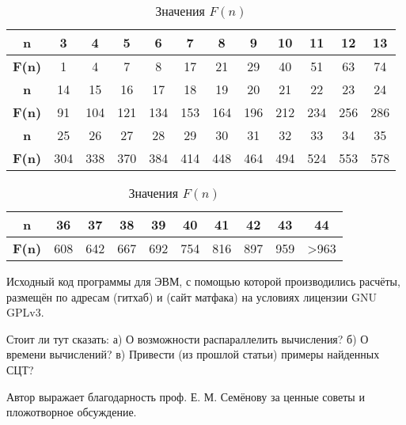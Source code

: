 \documentclass{article}
\begin{document}
\begin{table}[H]
\caption{Значения $F(n)$}
\label{tabular:pc_counted}
\begin{center}
\begin{tabular}{|c|c|c|c|c|c|c|c|c|c|c|c|}
\hline
\textbf{n}    &  3 & 4 & 5 & 6 &  7 &  8 &  9 & 10 & 11 & 12 & 13 \\
\hline
\textbf{F(n)} &  1 & 4 & 7 & 8 & 17 & 21 & 29 & 40 & 51 & 63 & 74  \\
\hline
\hline
\textbf{n}    &  14 &  15 &  16 &  17 &  18 &  19 &  20 &  21 &  22 &  23 &  24 \\
\hline
\textbf{F(n)} &  91 & 104 & 121 & 134 & 153 & 164 & 196 & 212 & 234 & 256 & 286  \\
\hline
\hline
\textbf{n}    &  25 &  26 &  27 &  28 &  29 &  30 &  31 &  32 &  33 &  34 &  35 \\
\hline
\textbf{F(n)} & 304 & 338 & 370 & 384 & 414 & 448 & 464 & 494 & 524 & 553 & 578  \\
\hline
\end{tabular}
\begin{tabular}{|c|c|c|c|c|c|c|c|c|c|}
\hline
\textbf{n}    &  36 &  37 &  38 &  39 &  40 &  41 &  42 &  43 & 44 \\

\hline
\textbf{F(n)} & 608 & 642 & 667 & 692 & 754 & 816 & 897 & 959 & >963 \\
\hline
\end{tabular}
\end{center}
\end{table}


Исходный код программы для ЭВМ, с помощью которой производились расчёты, размещён по адресам (гитхаб) и (сайт матфака) на условиях лицензии GNU GPLv3. 





Стоит ли тут сказать:
а) О возможности распараллелить вычисления?
б) О времени вычислений?
в) Привести (из прошлой статьи) примеры найденных СЦТ?



Автор выражает благодарность проф. Е. М. Семёнову за ценные советы и пложотворное обсуждение.













\end{document}

